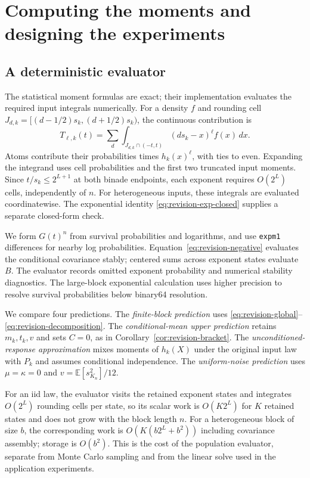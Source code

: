\section{Computing the moments and designing the experiments}\label{sec:methods}
\subsection{A deterministic evaluator}
The statistical moment formulas are exact; their implementation evaluates
the required input integrals numerically. For a density $f$ and rounding
cell $J_{d,k}=[(d-1/2)s_k,(d+1/2)s_k)$, the continuous contribution is
\begin{equation}\label{eq:cell-integration}
 T_{\ell,k}(t)=\sum_d\int_{J_{d,k}\cap(-t,t)}
                         (d s_k-x)^\ell f(x)\,dx.
\end{equation}
Atoms contribute their probabilities times $h_k(x)^\ell$, with ties to
even. Expanding the integrand uses cell probabilities and the first two
truncated input moments. Since $t/s_k\le2^{L+1}$ at both binade endpoints,
each exponent requires $O(2^L)$ cells, independently of $n$.
For heterogeneous inputs, these integrals are evaluated coordinatewise.
The exponential identity \eqref{eq:revision-exp-closed} supplies a separate
closed-form check.

We form $G(t)^n$ from survival probabilities and logarithms, and use
\texttt{expm1} differences for nearby log probabilities.
Equation~\eqref{eq:revision-negative} evaluates the conditional covariance
stably; centered sums across exponent states evaluate $B$. The evaluator
records omitted exponent probability and numerical stability diagnostics.
The large-block exponential calculation uses higher precision to resolve
survival probabilities below binary64 resolution.

We compare four predictions. The \emph{finite-block prediction} uses
\eqref{eq:revision-global}--\eqref{eq:revision-decomposition}.
The \emph{conditional-mean upper prediction} retains $m_k,t_k,v$ and sets
$C=0$, as in Corollary~\ref{cor:revision-bracket}.
The \emph{unconditioned-response approximation} mixes moments of $h_k(X)$
under the original input law with $P_k$ and assumes conditional
independence. The \emph{uniform-noise prediction} uses
$\mu=\kappa=0$ and $v=\mathbb E[s_{K_n}^2]/12$.

For an iid law, the evaluator visits the retained exponent states and
integrates $O(2^L)$ rounding cells per state, so its scalar work is
$O(K2^L)$ for $K$ retained states and does not grow with the block length
$n$. For a heterogeneous block of size $b$, the corresponding work is
$O(K(b2^L+b^2))$ including covariance assembly; storage is $O(b^2)$.
This is the cost of the population evaluator, separate from Monte Carlo
sampling and from the linear solve used in the application experiments.

